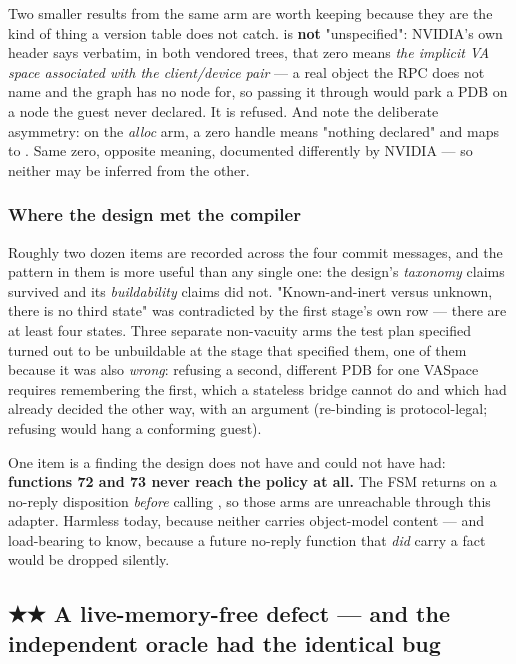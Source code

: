 \documentclass[10.5pt]{article}
\begin{document}
Two smaller results from the same arm are worth keeping because they are the kind of thing a
version table does not catch.  is \textbf{not} "unspecified": NVIDIA's own
header says verbatim, in both vendored trees, that zero means \emph{the implicit VA space
associated with the client/device pair} — a real object the RPC does not name and the graph has
no node for, so passing it through would park a PDB on a node the guest never declared. It is
refused. And note the deliberate asymmetry: on the \emph{alloc} arm, a zero handle means "nothing
declared" and maps to . Same zero, opposite meaning, documented differently by NVIDIA
— so neither may be inferred from the other.

\subsubsection*{Where the design met the compiler}

Roughly two dozen items are recorded across the four commit messages, and the pattern in them is
more useful than any single one: the design's \emph{taxonomy} claims survived and its
\emph{buildability} claims did not. "Known-and-inert versus unknown, there is no third state" was
contradicted by the first stage's own row — there are at least four states. Three separate
non-vacuity arms the test plan specified turned out to be unbuildable at the stage that specified
them, one of them because it was also \emph{wrong}: refusing a second, different PDB for one
VASpace requires remembering the first, which a stateless bridge cannot do and which
 had already decided the other way, with an argument (re-binding is protocol-legal;
refusing would hang a conforming guest).

One item is a finding the design does not have and could not have had: \textbf{functions 72 and
73 never reach the policy at all.} The FSM returns on a no-reply disposition \emph{before} calling
, so those arms are unreachable through this adapter. Harmless today, because
neither carries object-model content — and load-bearing to know, because a future no-reply
function that \emph{did} carry a fact would be dropped silently.

\subsection{\texorpdfstring{★★ A live-memory-free defect --- and the independent oracle had the identical bug}{A live-memory-free defect --- and the independent oracle had the identical bug}}
\label{sec:oracle}
\end{document}
